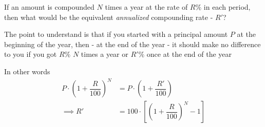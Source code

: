 

\question[3]  If an amount is compounded $N$ times a year at the rate of
$R\%$ in each period, then what would be the equivalent \textit{annualized}
compounding rate - $R'$? 


\ifprintanswers
\fi 

\begin{solution}[\halfpage]
	The point to understand is that if you started with a principal 
	amount $P$ at the beginning of the year, then
	- at the end of the year - it should make no difference to you if you got $R\%$
	 $N$ times a year or $R'\%$ once at the end of the year
	 
	 In other words
	 \begin{align}
	 	P\cdot\left( 1 + \dfrac{R}{100}\right)^N &= P\cdot\left( 1 + \dfrac{R'}{100}\right) \\
	 	\implies R' &= 100\cdot\left[ \left( 1+\dfrac{R}{100}\right)^N - 1 \right]
	 \end{align}
\end{solution}
\ifprintanswers\begin{codex}\end{codex}\fi
